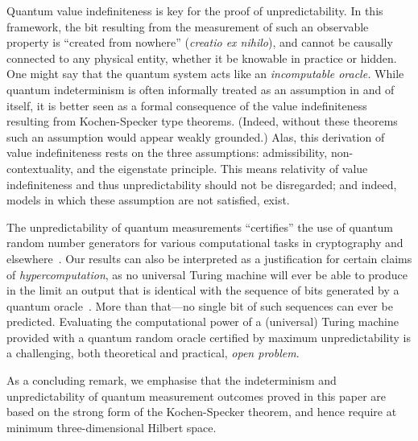 \documentclass[%
 superscriptaddress,
 preprint,
 showpacs,
 showkeys,
 preprintnumbers,
  amsmath,amssymb,
  aps,
 pra,
  longbibliography,
  floatfix,
 ]{revtex4-1}
\theoremstyle{definition}
\begin{document}

Quantum value indefiniteness %
is key for the proof of unpredictability.
In this framework, the bit resulting from the measurement of such an observable property is ``created from nowhere'' {\color{green}({\it creatio ex nihilo})},
and cannot be causally connected to any physical entity, whether it be knowable in practice or hidden.
One might say that the quantum system acts like an {\em incomputable oracle.}
While quantum indeterminism is often informally treated as an assumption in and of itself, it is better seen as a formal consequence of {\color{green}the value indefiniteness resulting from Kochen-Specker type} theorems.
(Indeed, without these theorems such an assumption would appear weakly grounded.)
{\color{green} Alas, this} derivation of value indefiniteness rests on the three assumptions: admissibility, non-contextuality, and the eigenstate principle.
This {\color{green} means} relativity of value indefiniteness and thus unpredictability should not be {\color{green}disregarded;} and indeed{\color{green}, models} in which these assumption are not {\color{green}satisfied,} exist.


The
 unpredictability of quantum measurements ``certifies'' the use of quantum random number generators for various computational tasks in cryptography and elsewhere~\cite{svozil-qct,stefanov-2000,10.1038/nature09008}.
Our results can also be interpreted as a justification for certain claims of {\em hypercomputation},
as no universal Turing machine will ever be able to produce in the limit an output that
is identical with the sequence of bits generated by %
a quantum oracle~\cite{qrand-oracle}.
More than that---no single bit %
of such sequences can ever be predicted. Evaluating the computational power of a (universal) Turing machine provided with a quantum random oracle certified by maximum unpredictability is a challenging,
both theoretical and practical, {\it open problem}.

As a concluding remark, we  emphasise that the indeterminism and unpredictability of quantum measurement outcomes proved in this paper are based on the  strong form of the Kochen-Specker theorem, and hence require at minimum three-dimensional Hilbert space.
\end{document}

